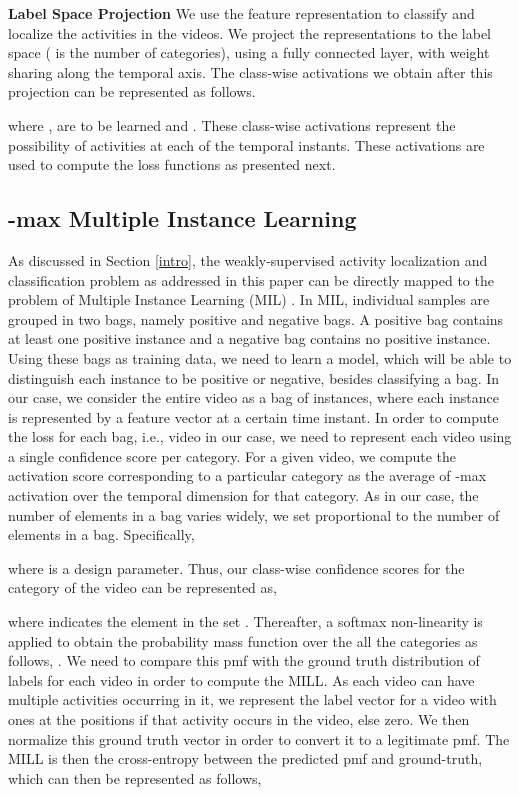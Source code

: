 \documentclass[runningheads]{llncs}
\begin{document}
\textbf{Label Space Projection}
We use the feature representation  to classify and localize the activities in the videos. We project the representations  to the label space ( is the number of categories), using a fully connected layer, with weight sharing along the temporal axis. The class-wise activations we obtain after this projection can be represented as follows.


where ,  are to be learned and . These class-wise activations represent the possibility of activities at each of the temporal instants. These activations are used to compute the loss functions as presented next. 

\subsection{-max Multiple Instance Learning}
As discussed in Section \ref{intro}, the weakly-supervised activity localization and classification problem as addressed in this paper can be directly mapped to the problem of Multiple Instance Learning (MIL) \cite{zhou2004multi}. In MIL, individual samples are grouped in two bags, namely positive and negative bags. A positive bag contains at least one positive instance and a negative bag contains no positive instance. Using these bags as training data, we need to learn a model, which will be able to distinguish each instance to be positive or negative, besides classifying a bag. In our case, we consider the entire video as a bag of instances, where each instance is represented by a feature vector at a certain time instant. In order to compute the loss for each bag, i.e., video in our case, we need to represent each video using a single confidence score per category. For a given video, we compute the activation score corresponding to a particular category as the average of -max activation over the temporal dimension for that category. As in our case, the number of elements in a bag varies widely, we set  proportional to the number of elements in a bag. Specifically,

where  is a design parameter. Thus, our class-wise confidence scores for the  category of the  video can be represented as,

where  indicates the  element in the set . Thereafter, a softmax non-linearity is applied to obtain the probability mass function over the all the categories as follows, . We need to compare this pmf with the ground truth distribution of labels for each video in order to compute the MILL. As each video can have multiple activities occurring in it, we represent the label vector for a video with ones at the positions if that activity occurs in the video, else zero. We then normalize this ground truth vector in order to convert it to a legitimate pmf. The MILL is then the cross-entropy between the predicted pmf  and ground-truth, which can then be represented as follows,
\end{document}
